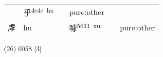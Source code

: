 \documentclass[14pt,a4paper]{scrartcl}
\begin{document}
\begin{longtable}[c]{@{}llllll@{}}
\begin{minipage}[t]{0.14\columnwidth}
\strut\end{minipage} &
\begin{minipage}[t]{0.14\columnwidth}\raggedright\strut
乎\textsuperscript{4e4e~hu}
\strut\end{minipage} &
\begin{minipage}[t]{0.14\columnwidth}\raggedright\strut
\strut\end{minipage} &
\begin{minipage}[t]{0.14\columnwidth}\raggedright\strut
pure:other
\strut\end{minipage}\tabularnewline
\begin{minipage}[t]{0.14\columnwidth}\raggedright\strut
虖
\strut\end{minipage} &
\begin{minipage}[t]{0.14\columnwidth}\raggedright\strut
hu
\strut\end{minipage} &
\begin{minipage}[t]{0.14\columnwidth}\raggedright\strut
\strut\end{minipage} &
\begin{minipage}[t]{0.14\columnwidth}\raggedright\strut
嘑\textsuperscript{5611~xu}
\strut\end{minipage} &
\begin{minipage}[t]{0.14\columnwidth}\raggedright\strut
\strut\end{minipage} &
\begin{minipage}[t]{0.14\columnwidth}\raggedright\strut
pure:other
\strut\end{minipage}\tabularnewline
\bottomrule
\end{longtable}

(26) 0058 {[}3{]}
\end{document}
